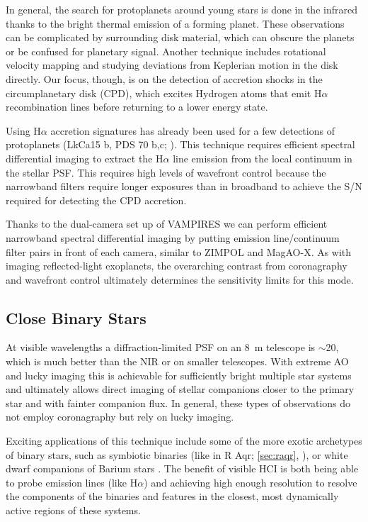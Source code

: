 In general, the search for protoplanets around young stars is done in the infrared thanks to the bright thermal emission of a forming planet. These observations can be complicated by surrounding disk material, which can obscure the planets or be confused for planetary signal. Another technique includes rotational velocity mapping and studying deviations from Keplerian motion in the disk directly. Our focus, though, is on the detection of accretion shocks in the circumplanetary disk (CPD), which excites Hydrogen atoms that emit H$\alpha$ recombination lines before returning to a lower energy state.

Using H$\alpha$ accretion signatures has already been used for a few detections of protoplanets (LkCa15 b, PDS 70 b,c; \citealp{sallum_accreting_2015,wagner_magellan_2018,haffert_two_2019}). This technique requires efficient spectral differential imaging to extract the H$\alpha$ line emission from the local continuum in the stellar PSF. This requires high levels of wavefront control because the narrowband filters require longer exposures than in broadband to achieve the S/N required for detecting the CPD accretion.

Thanks to the dual-camera set up of VAMPIRES we can perform efficient narrowband spectral differential imaging by putting emission line/continuum filter pairs in front of each camera, similar to ZIMPOL and MagAO-X. As with imaging reflected-light exoplanets, the overarching contrast from coronagraphy and wavefront control ultimately determines the sensitivity limits for this mode.

\subsection{Close Binary Stars}

At visible wavelengths a diffraction-limited PSF on an \SI{8}{\meter} telescope is $\sim$\SI{20}{\mas}, which is much better than the NIR or on smaller telescopes. With extreme AO and lucky imaging this is achievable for sufficiently bright multiple star systems and ultimately allows direct imaging of stellar companions closer to the primary star and with fainter companion flux. In general, these types of observations do not employ coronagraphy but rely on lucky imaging.

Exciting applications of this technique include some of the more exotic archetypes of binary stars, such as symbiotic binaries (like in R Aqr; \autoref{sec:raqr}, \citealp{schmid_spherezimpol_2017}), or white dwarf companions of Barium stars \citep{mcclure_binary_1980,escorza_barium_2019}. The benefit of visible HCI is both being able to probe emission lines (like H$\alpha$) and achieving high enough resolution to resolve the components of the binaries and features in the closest, most dynamically active regions of these systems.

